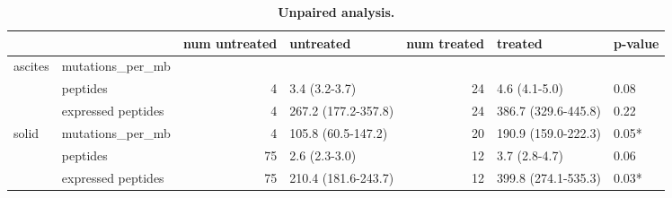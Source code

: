 \begin{table}
\label {tab:cohort}

\begin{tabular}{llrlrll}
\toprule
        &                    &  num untreated &            untreated &  num treated &              treated &           p-value \\
\midrule
ascites & mutations\_per\_mb &                &                      &              &                      &                   \\
        & peptides &              4 &        3.4 (3.2-3.7) &           24 &        4.6 (4.1-5.0) &              0.08 \\
        & expressed peptides &              4 &  267.2 (177.2-357.8) &           24 &  386.7 (329.6-445.8) &              0.22 \\
solid & mutations\_per\_mb &              4 &   105.8 (60.5-147.2) &           20 &  190.9 (159.0-222.3) &             0.05* \\
        & peptides &             75 &        2.6 (2.3-3.0) &           12 &        3.7 (2.8-4.7) &              0.06 \\
        & expressed peptides &             75 &  210.4 (181.6-243.7) &           12 &  399.8 (274.1-535.3) &             0.03* \\
\bottomrule
\end{tabular}

\caption{\textbf{Unpaired analysis.}}
\end{table}

